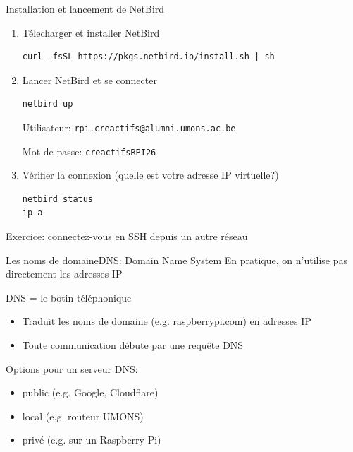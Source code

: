\documentclass[
aspectratio=169 %
]{beamer}
\begin{document}
\begin{frame}[fragile]{Installation et lancement de NetBird}
    \begin{enumerate}
        \item Télecharger et installer NetBird
              \begin{verbatim}
curl -fsSL https://pkgs.netbird.io/install.sh | sh \end{verbatim}
              \medskip
        \item Lancer NetBird et se connecter
              \begin{verbatim}
netbird up \end{verbatim}

              Utilisateur: \texttt{rpi.creactifs@alumni.umons.ac.be}

              Mot de passe: \texttt{creactifsRPI26}
              \medskip
        \item Vérifier la connexion (quelle est votre adresse IP virtuelle?)
              \begin{verbatim}
netbird status
ip a
\end{verbatim}
    \end{enumerate}
    \bigskip

    Exercice: connectez-vous en SSH depuis un autre réseau

\end{frame}

\begin{frame}{Les noms de domaine}{DNS: Domain Name System}
    En pratique, on n'utilise pas directement les adresses IP

    \bigskip
    DNS = \alert{le botin téléphonique}
    \begin{itemize}
        \item Traduit les noms de domaine (e.g. raspberrypi.com) en adresses IP
        \item Toute communication débute par une requête DNS
    \end{itemize}

    \bigskip
    Options pour un serveur DNS:
    \begin{itemize}
        \item public (e.g. Google, Cloudflare)
        \item local (e.g. routeur UMONS)
        \item privé (e.g. sur un Raspberry Pi)
    \end{itemize}
\end{frame}
\end{document}
